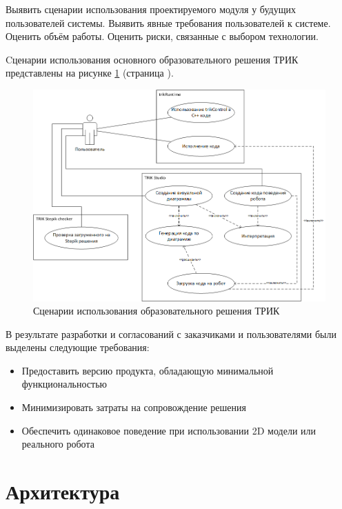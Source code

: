 \documentclass[14pt]{matmex-diploma-custom}
\begin{document}
Выявить сценарии использования проектируемого модуля у будущих пользователей системы.
Выявить явные требования пользователей к системе.
Оценить объём работы.
Оценить риски, связанные с выбором технологии.

Cценарии использования основного образовательного решения ТРИК представлены на рисунке \ref{usecases} (страница \pageref{usecases}).

\begin{figure}[h]
	\includegraphics[width=\textwidth]{images/diploma-usecase.png}
	\caption{Сценарии использования образовательного решения ТРИК}
	\label{usecases}
\end{figure}

В результате разработки и согласований с заказчиками и пользователями были выделены следующие требования:
\begin{itemize}
    \item Предоставить версию продукта, обладающую минимальной функциональностью
    \item Минимизировать затраты на сопровождение решения
    \item Обеспечить одинаковое поведение при использовании 2D модели или реального робота
\end{itemize}



\section{Архитектура}
\end{document}
